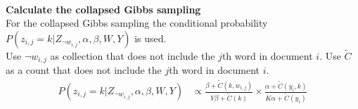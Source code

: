 \\
\textbf{Calculate the collapsed Gibbs sampling}\\
For the collapsed Gibbs sampling the conditional probability $P(z_{i,j} = k | Z_{\neg w_{i,j}}, \alpha, \beta, W, Y)$ is used.
~\\ Use $\neg w_{i,j}$ as collection that does not include the $j$th word in document $i$. Use $\widetilde{C}$ as a count that does not include the $j$th word in document $i$.
\begin{align}
P(z_{i,j} = k | Z_{\neg w_{i,j}}, \alpha, \beta, W, Y) &\propto \frac{\beta + \widetilde{C}(k, w_{i,j})}{V\beta + \widetilde{C}(k)} \times \frac{\alpha + \widetilde{C}(y_i, k)}{K\alpha + \widetilde{C}(y_i)}
\end{align}
